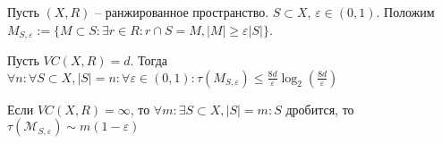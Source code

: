 \documentclass[document.tex]{subfiles}
\begin{document}
\begin{definition}
    Пусть $(X, R)$ -- ранжированное пространство. $S \subset X$, $\varepsilon \in (0, 1)$. Положим $M_{S, \varepsilon} :=
    \{M \subset S: \exists r \in R: r \cap S = M, |M| \geq \varepsilon |S|\}$.
\end{definition}

\begin{theorem}
    Пусть $VC(X, R) = d$. Тогда $\forall n: \forall S \subset X, |S| = n: \forall \varepsilon \in (0, 1): \tau(M_{S,
    \varepsilon}) \leq \frac{8d}{\varepsilon}\log_2 (\frac{8d}{\varepsilon})$
\end{theorem}

\begin{remark}
    Если $VC(X, R) = \infty$, то $\forall m: \exists S \subset X, |S| = m: S$ дробится, то $\tau(\mathcal{M}_{S,
    \varepsilon}) \sim m(1 -
    \varepsilon)$
\end{remark}
\end{document}
